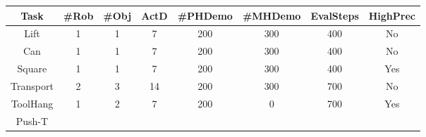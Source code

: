 \setlength\tabcolsep{2 pt}
\begin{tabular}{c|ccccccc}
\toprule
Task      & \#Rob & \#Obj & ActD & \#PHDemo & \#MHDemo & EvalSteps & HighPrec \\
\midrule
Lift      & 1      & 1      & 7    & 200   & 300   & 400       & No       \\
Can       & 1      & 1      & 7    & 200   & 300   & 400       & No       \\
Square    & 1      & 1      & 7    & 200   & 300   & 400       & Yes      \\
Transport & 2      & 3      & 14   & 200   & 300   & 700       & No       \\
ToolHang  & 1      & 2      & 7    & 200   & 0     & 700       & Yes     \\
Push-T    
\bottomrule
\end{tabular}
